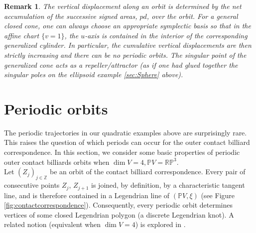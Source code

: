 \documentclass{article}
\newcommand{\Z}{\mathbb{Z}} %
\newtheorem{rmk}{Remark}
\begin{document}
\begin{rmk}
The vertical displacement along an orbit is determined by the net accumulation of the successive signed areas, $pd$, over the orbit.  For a general closed cone, one can always choose an appropriate symplectic basis so that in the affine chart $\{ v = 1\}$, the $u$-axis is contained in the interior of the corresponding generalized cylinder. In particular, the cumulative vertical displacements are then strictly increasing and there can be no periodic orbits. The singular point of the generalized cone acts as a repeller/attractor (as if one had glued together the singular poles on the ellipsoid example \ref{sec:Sphere} above).

\end{rmk}


\section{Periodic orbits}\label{sec:periodic}

The periodic trajectories in our quadratic examples above are surprisingly rare. This 
raises the question of which periods can occur for the outer contact billiard 
correspondence. In this section, we consider some basic properties of periodic outer 
contact billiards orbits when $\dim V  = 4, \mathbb{P}V = \mathbb{RP}^3$.\\

Let $(Z_j)_{j\in \Z}$ be an orbit of the contact billiard correspondence. Every pair of 
consecutive points $Z_j$, $Z_{j+1}$ is joined, by definition, by a characteristic tangent 
line, and is therefore contained in a Legendrian line of $(\mathbb{P}V,\xi)$ (see Figure 
\ref{fig:contactcorrespondence}). Consequently, every periodic orbit determines vertices 
of some closed Legendrian polygon (a discrete Legendrian knot). A related notion 
(equivalent when $\dim V=4$) is explored in \cite{ConOvsLagrConf}.
\end{document}
